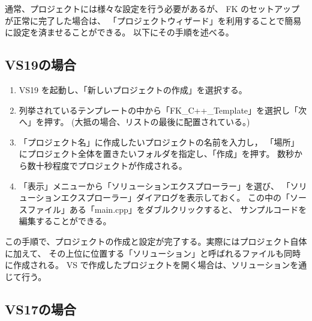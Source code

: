 \documentclass[a4paper]{jsarticle}
\begin{document}
通常、プロジェクトには様々な設定を行う必要があるが、
FK のセットアップが正常に完了した場合は、
「プロジェクトウィザード」を利用することで簡易に設定を済ませることができる。
以下にその手順を述べる。

\subsection{VS19の場合}
\begin{enumerate}
 \item VS19 を起動し、「新しいプロジェクトの作成」を選択する。

 \item 列挙されているテンプレートの中から「FK\_C++\_Template」を選択し「次へ」を押す。
	(大抵の場合、リストの最後に配置されている。)

 \item 「プロジェクト名」に作成したいプロジェクトの名前を入力し，
	「場所」にプロジェクト全体を置きたいフォルダを指定し、「作成」を押す。
	数秒から数十秒程度でプロジェクトが作成される。

 \item 「表示」メニューから「ソリューションエクスプローラー」を選び、
	「ソリューションエクスプローラー」ダイアログを表示しておく。
	この中の「ソースファイル」ある「main.cpp」をダブルクリックすると、
	サンプルコードを編集することができる。

\end{enumerate}

この手順で、プロジェクトの作成と設定が完了する。実際にはプロジェクト自体に加えて、
その上位に位置する「ソリューション」と呼ばれるファイルも同時に作成される。
VS で作成したプロジェクトを開く場合は、ソリューションを通じて行う。

\subsection{VS17の場合}
\end{document}
